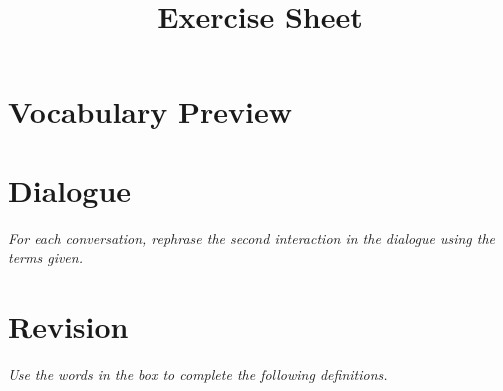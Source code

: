 \documentclass{article}
\title{Exercise Sheet}
\begin{document}
\section{Vocabulary Preview}

%
%
%
%
%
%
%
%
%
%
%
%
%
%
%
%
%
%
%
%


\newpage
\section{Dialogue}

\noindent \textit{For each conversation, rephrase the second interaction in the dialogue using the terms given.}

%
%
%
%
%
%
%
%
%
%
%
%
%
%
%
%
%
%
%
%

\newpage
\section{Revision}

\noindent \textit{Use the words in the box to complete the following definitions.}
\end{document}
